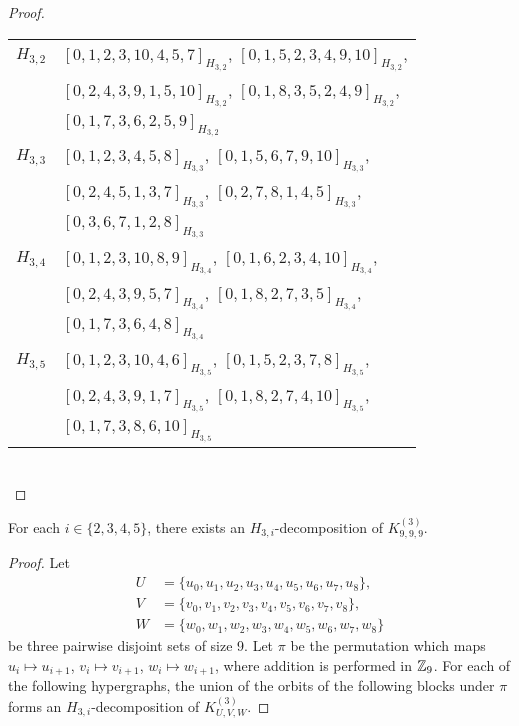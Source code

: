 \begin{subappendices}
\begin{proof}
\begin{tabular}{|c|l|}
\hline
$H_{3,2}$ &
  $[0, 1, 2, 3, 10, 4, 5, 7]_{H_{3,2}}$,
  $[0, 1, 5, 2, 3, 4, 9, 10]_{H_{3,2}}$, \\ &
  $[0, 2, 4, 3, 9, 1, 5, 10]_{H_{3,2}}$,
  $[0, 1, 8, 3, 5, 2, 4, 9]_{H_{3,2}}$, \\ &
  $[0, 1, 7, 3, 6, 2, 5, 9]_{H_{3,2}}$
\\ \hline
$H_{3,3}$ &
  $[0, 1, 2, 3, 4, 5, 8]_{H_{3,3}}$,
  $[0, 1, 5, 6, 7, 9, 10]_{H_{3,3}}$, \\ &
  $[0, 2, 4, 5, 1, 3, 7]_{H_{3,3}}$,
  $[0, 2, 7, 8, 1, 4, 5]_{H_{3,3}}$, \\ &
  $[0, 3, 6, 7, 1, 2, 8]_{H_{3,3}}$
\\ \hline
$H_{3,4}$ &
  $[0, 1, 2, 3, 10, 8, 9]_{H_{3,4}}$,
  $[0, 1, 6, 2, 3, 4, 10]_{H_{3,4}}$, \\ &
  $[0, 2, 4, 3, 9, 5, 7]_{H_{3,4}}$,
  $[0, 1, 8, 2, 7, 3, 5]_{H_{3,4}}$, \\ &
  $[0, 1, 7, 3, 6, 4, 8]_{H_{3,4}}$
\\ \hline
$H_{3,5}$ &
  $[0, 1, 2, 3, 10, 4, 6]_{H_{3,5}}$,
  $[0, 1, 5, 2, 3, 7, 8]_{H_{3,5}}$, \\ &
  $[0, 2, 4, 3, 9, 1, 7]_{H_{3,5}}$,
  $[0, 1, 8, 2, 7, 4, 10]_{H_{3,5}}$, \\ &
  $[0, 1, 7, 3, 8, 6, 10]_{H_{3,5}}$
\\ \hline
\end{tabular}
\\
\end{proof}


\begin{example} \label{eg:H_3i-k999}
For each $i \in \{2,3,4,5\}$, there exists an $H_{3,i}$-decomposition of $K_{9,9,9}^{(3)}$.
\end{example}

\begin{proof}
Let
\begin{align*}
    U &= \{u_0, u_1, u_2, u_3, u_4, u_5, u_6, u_7, u_8\}, \\
    V &= \{v_0, v_1, v_2, v_3, v_4, v_5, v_6, v_7, v_8\}, \\
    W &= \{w_0, w_1, w_2, w_3, w_4, w_5, w_6, w_7, w_8\}
\end{align*}
be three pairwise disjoint sets of size 9.
Let $\pi$ be the permutation which maps $u_i \mapsto u_{i+1}$, $v_i \mapsto v_{i+1}$, $w_i \mapsto w_{i+1}$, where addition is performed in $\mathbb{Z}_9$.
For each of the following hypergraphs, the union of the orbits of the following blocks under $\pi$ forms an $H_{3,i}$-decomposition of $K_{U,V,W}^{(3)}$.


\end{proof}
\end{subappendices}
